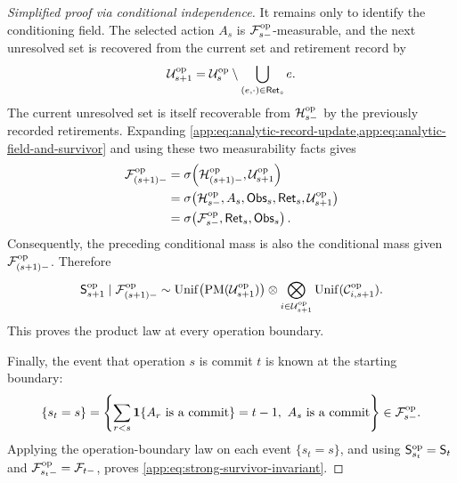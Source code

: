 {\begin{proof}[Simplified proof via conditional independence]
It remains only to identify the conditioning field.  The selected action
\(A_s\) is \(\mathcal F^{\mathrm{op}}_{s-}\)-measurable, and the next unresolved set is
recovered from the current set and retirement record by
\[
 \mathcal U^{\mathrm{op}}_{s+1}
 =
 \mathcal U^{\mathrm{op}}_{s}
 \setminus
 \bigcup_{(e,\cdot)\in\mathsf{Ret}_{s}}e.
\]
The current unresolved set is itself recoverable from
\(\mathcal H^{\mathrm{op}}_{s-}\) by the previously recorded retirements.  Expanding
\cref{app:eq:analytic-record-update,app:eq:analytic-field-and-survivor} and
using these two measurability facts gives
\begin{align*}
 \mathcal F^{\mathrm{op}}_{(s+1)-}
 &=\sigma\!\left(
   \mathcal H^{\mathrm{op}}_{(s+1)-},\mathcal U^{\mathrm{op}}_{s+1}\right)\\
 &=\sigma\!\left(
   \mathcal H^{\mathrm{op}}_{s-},A_s,\mathsf{Obs}_{s},
   \mathsf{Ret}_{s},\mathcal U^{\mathrm{op}}_{s+1}\right)\\
 &=\sigma\!\left(
   \mathcal F^{\mathrm{op}}_{s-},\mathsf{Ret}_{s},\mathsf{Obs}_{s}\right).
\end{align*}
Consequently, the preceding conditional mass is also the conditional mass
given \(\mathcal F^{\mathrm{op}}_{(s+1)-}\).  Therefore
\[
 \mathsf S^{\mathrm{op}}_{s+1}\mid\mathcal F^{\mathrm{op}}_{(s+1)-}
 \sim
 \operatorname{Unif}\bigl(
   \operatorname{PM}(\mathcal U^{\mathrm{op}}_{s+1})\bigr)
 \otimes
 \bigotimes_{i\in\mathcal U^{\mathrm{op}}_{s+1}}
   \operatorname{Unif}(\mathcal C^{\mathrm{op}}_{i,s+1}).
\]
This proves the product law at every operation boundary.

Finally, the event that operation \(s\) is commit \(t\) is known at the
starting boundary:
\[
 \{s_t=s\}
 =\left\{\sum_{r<s}\mathbf 1\{A_r\text{ is a commit}\}=t-1,
             \ A_s\text{ is a commit}\right\}
 \in\mathcal F^{\mathrm{op}}_{s-}.
\]
Applying the operation-boundary law on each event \(\{s_t=s\}\), and using
\(\mathsf S^{\mathrm{op}}_{s_t}=\mathsf S_{t}\) and
\(\mathcal F^{\mathrm{op}}_{s_t-}=\mathcal F_{t-}\), proves
\eqref{app:eq:strong-survivor-invariant}.
\end{proof}
}

